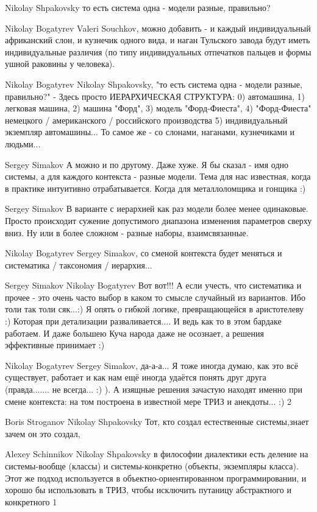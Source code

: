 \documentclass[11pt,a4paper]{article}
\begin{document}
Nikolay Shpakovsky то есть система одна - модели разные, правильно?  

Nikolay Bogatyrev Valeri Souchkov, можно добавить - и каждый индивидуальный
африканский слон, и кузнечик одного вида, и наган Тульского завода будут иметь
индивидуальные различия (по типу индивидуальных отпечатков пальцев и формы
ушной раковины у человека).

Nikolay Bogatyrev Nikolay Shpakovsky, "то есть система одна - модели разные,
правильно?" - Здесь просто ИЕРАРХИЧЕСКАЯ СТРУКТУРА: 0) автомашина, 1) легковая
машина, 2) машина "Форд", 3) модель "Форд-Фиеста", 4) "Форд-Фиеста" немецкого
/ американского / российского производства 5) индивидуальный экземпляр
автомашины...  То самое же - со слонами, наганами, кузнечиками и людьми...

Sergey Simakov А можно и по другому. Даже хуже. Я бы сказал - имя одно
системы, а для каждого контекста - разные модели. Тема для нас известная,
когда в практике интуитивно отрабатывается. Когда для металлоломщика и гонщика
:)

Sergey Simakov В варианте с иерархией как раз модели более менее
одинаковые. Просто происходит сужение допустимого диапазона изменения
параметров сверху вниз. Ну или в более сложном - разные наборы,
взаимсвязанные.

Nikolay Bogatyrev Sergey Simakov, со сменой контекста будет меняться и
систематика / таксономия / иерархия...

Sergey Simakov Nikolay Bogatyrev Вот вот!!! А если учесть, что систематика и
прочее - это очень часто выбор в каком то смысле случайный из вариантов. Ибо
толи так толи сяк...:) Я опять о гибкой логике, превращающейся в аристотелеву
:) Которая при детализации разваливается....  И ведь как то в этом бардаке
работаем. И даже большею Куча народа даже не осознает, а решения эффективные
принимает :)

Nikolay Bogatyrev Sergey Simakov, да-а-а... Я тоже иногда думаю, как это всё
существует, работает и как нам ещё иногда удаётся понять друг друга
(правда....... не всегда... :) ). А изящные решения зачастую находят именно
при смене контекста: на том построена в известной мере ТРИЗ и анекдоты... :) 2

Boris Stroganov Nikolay Shpakovsky Тот, кто создал естественные системы,знает
зачем он это создал,

Alexey Schinnikov Nikolay Shpakovsky в философии диалектики есть деление на
системы-вообще (классы) и системы-конкретно (объекты, экземпляры класса). Этот
же подход используется в объектно-ориентированном программировании, и хорошо
бы использовать в ТРИЗ, чтобы исключить путаницу абстрактного и конкретного 1
\end{document}
